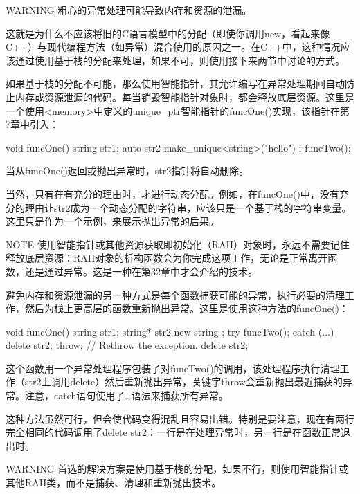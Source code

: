 \begin{myWarning}{WARNING}
粗心的异常处理可能导致内存和资源的泄漏。
\end{myWarning}

这就是为什么不应该将旧的C语言模型中的分配（即使你调用new，看起来像C++）与现代编程方法（如异常）混合使用的原因之一。在C++中，这种情况应该通过使用基于栈的分配来处理，如果不可，则使用接下来两节中讨论的方式。


如果基于栈的分配不可能，那么使用智能指针，其允许编写在异常处理期间自动防止内存或资源泄漏的代码。每当销毁智能指针对象时，都会释放底层资源。这里是一个使用<memory>中定义的unique\_ptr智能指针的funcOne()实现，该指针在第7章中引入：

\begin{cpp}
void funcOne()
{
    string str1;
    auto str2 { make_unique<string>("hello") };
    funcTwo();
}
\end{cpp}

当从funcOne()返回或抛出异常时，str2指针将自动删除。

当然，只有在有充分的理由时，才进行动态分配。例如，在funcOne()中，没有充分的理由让str2成为一个动态分配的字符串，应该只是一个基于栈的字符串变量。这里只是作为一个示例，来展示抛出异常的后果。

\begin{myNotic}{NOTE}
使用智能指针或其他资源获取即初始化（RAII）对象时，永远不需要记住释放底层资源：RAII对象的析构函数会为你完成这项工作，无论是正常离开函数，还是通过异常。这是一种在第32章中才会介绍的技术。
\end{myNotic}


避免内存和资源泄漏的另一种方式是每个函数捕获可能的异常，执行必要的清理工作，然后为栈上更高层的函数重新抛出异常。这里是使用这种方法的funcOne()：

\begin{cpp}
void funcOne()
{
    string str1;
    string* str2 { new string {} };
    try {
        funcTwo();
    } catch (...) {
        delete str2;
        throw; // Rethrow the exception.
    }
    delete str2;
}
\end{cpp}

这个函数用一个异常处理程序包装了对funcTwo()的调用，该处理程序执行清理工作（str2上调用delete）然后重新抛出异常，关键字throw会重新抛出最近捕获的异常。注意，catch语句使用了…语法来捕获所有异常。

这种方法虽然可行，但会使代码变得混乱且容易出错。特别是要注意，现在有两行完全相同的代码调用了delete str2：一行是在处理异常时，另一行是在函数正常退出时。

\begin{myWarning}{WARNING}
首选的解决方案是使用基于栈的分配，如果不行，则使用智能指针或其他RAII类，而不是捕获、清理和重新抛出技术。
\end{myWarning}















